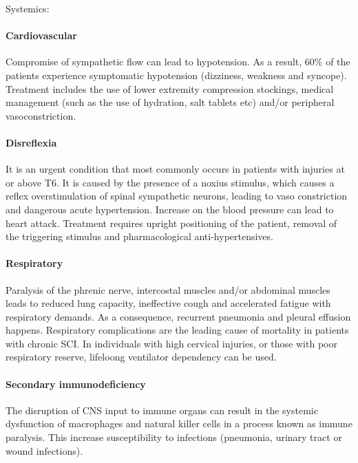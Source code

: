 \documentclass[12pt,article,oneside,a4paper]{memoir}
\begin{document}
Systemics:
\paragraph{Cardiovascular}
Compromise of sympathetic flow can lead to hypotension. As a result, 60\% of the
patients experience symptomatic hypotension (dizziness, weakness and syncope).
Treatment includes the use of lower extremity compression stockings, medical
management (such as the use of hydration, salt tablets etc) and/or peripheral
vasoconstriction.

\paragraph{Disreflexia}
It is an urgent condition that most commonly occurs in patients with injuries
at or above T6. It is caused by the presence of a noxius stimulus, which causes
a reflex overstimulation of spinal sympathetic neurons, leading to vaso
constriction and dangerous acute hypertension. Increase on the blood pressure
can lead to heart attack. Treatment requires upright positioning of the patient,
removal of the triggering stimulus and pharmacological anti-hypertensives.

\paragraph{Respiratory}
Paralysis of the phrenic nerve, intercostal muscles and/or abdominal muscles
leads to reduced lung capacity, ineffective cough and accelerated fatigue with
respiratory demands. As a consequence, recurrent pneumonia and pleural effusion
happens. Respiratory complications are the leading cause of mortality in patients
with chronic SCI. In individuals with high cervical injuries, or those with poor
respiratory reserve, lifeloong ventilator dependency can be used.

\paragraph{Secondary immunodeficiency}
The disruption of CNS input to immune organs can result in the systemic
dysfunction of macrophages and natural killer cells in a process known as immune
paralysis. This increase susceptibility to infections (pneumonia, urinary tract
or wound infections).
\end{document}
